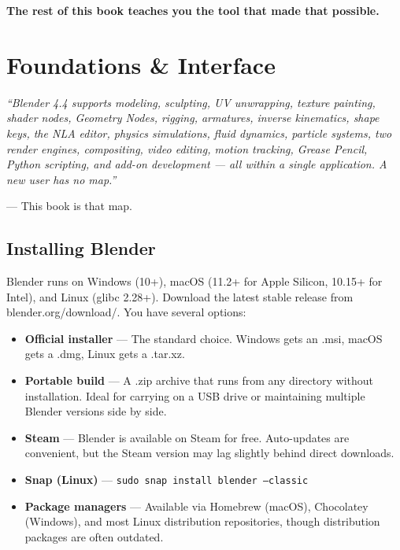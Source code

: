 \documentclass[11pt,letterpaper,twoside,openright]{book}
\begin{document}
\begin{quotebox}
\textbf{The rest of this book teaches you the tool that made that possible.}
\end{quotebox}


\chapter{Foundations \& Interface}
\label{ch:foundations}

\begin{quotebox}
\itshape ``Blender 4.4 supports modeling, sculpting, UV unwrapping, texture painting, shader nodes, Geometry Nodes, rigging, armatures, inverse kinematics, shape keys, the NLA editor, physics simulations, fluid dynamics, particle systems, two render engines, compositing, video editing, motion tracking, Grease Pencil, Python scripting, and add-on development --- all within a single application. A new user has no map.''

\upshape --- This book is that map.
\end{quotebox}

\section{Installing Blender}

Blender runs on Windows (10+), macOS (11.2+ for Apple Silicon, 10.15+ for Intel), and Linux (glibc 2.28+). Download the latest stable release from blender.org/download/. You have several options:

\begin{itemize}[leftmargin=2em]
  \item \textbf{Official installer} --- The standard choice. Windows gets an .msi, macOS gets a .dmg, Linux gets a .tar.xz.
  \item \textbf{Portable build} --- A .zip archive that runs from any directory without installation. Ideal for carrying on a USB drive or maintaining multiple Blender versions side by side.
  \item \textbf{Steam} --- Blender is available on Steam for free. Auto-updates are convenient, but the Steam version may lag slightly behind direct downloads.
  \item \textbf{Snap (Linux)} --- \texttt{sudo snap install blender --classic}
  \item \textbf{Package managers} --- Available via Homebrew (macOS), Chocolatey (Windows), and most Linux distribution repositories, though distribution packages are often outdated.
\end{itemize}
\end{document}
